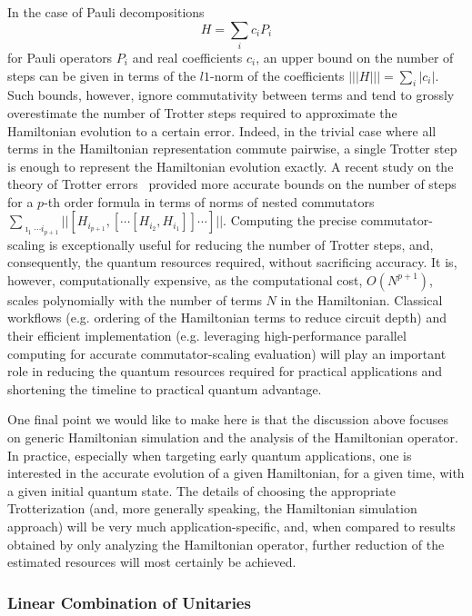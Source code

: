 In the case of Pauli decompositions
\begin{equation}
    H=\sum_i c_iP_i
\end{equation}
for Pauli operators $P_i$ and real coefficients $c_i$, an upper bound on the number of steps can be given in terms of the $l1$-norm of the coefficients $|||H|||=\sum_i|c_i|$.
Such bounds, however, ignore commutativity between terms and tend to grossly overestimate the number of Trotter steps required to approximate the Hamiltonian evolution to a certain error. Indeed, in the trivial case where all terms in the Hamiltonian representation commute pairwise, a single Trotter step is enough to represent the Hamiltonian evolution exactly. A recent study on the theory of Trotter errors~\cite{childs2019theory} provided more accurate bounds on the number of steps for a $p$-th order formula in terms of norms of nested commutators $\sum_{\imath_1 \cdots i_{p+1}}||[H_{i_{p+1}}, [\cdots[H_{i_2}, H_{i_1}]]\cdots]||$.  Computing the precise commutator-scaling is exceptionally useful for reducing the number of Trotter steps, and, consequently, the quantum resources required, without sacrificing accuracy. It is, however, computationally expensive, as the computational cost, $O(N^{p+1})$, scales polynomially with the number of terms $N$ in the Hamiltonian.
Classical workflows (e.g. ordering of the Hamiltonian terms to reduce circuit depth) and their efficient implementation (e.g. leveraging high-performance parallel computing for accurate commutator-scaling evaluation) will play an important role in reducing the quantum resources required for practical applications and shortening the timeline to practical quantum advantage. 

One final point we would like to make here is that the discussion above focuses on generic Hamiltonian simulation and the analysis of the Hamiltonian operator. In practice, especially when targeting early quantum applications, one is interested in the accurate evolution of a given Hamiltonian, for a given time, with a given initial quantum state. The details of choosing the appropriate Trotterization (and, more generally speaking, the Hamiltonian simulation approach) will be very much application-specific, and, when compared to results obtained by only analyzing the Hamiltonian operator, further reduction of the estimated resources will most certainly be achieved.


\subsubsection{Linear Combination of Unitaries}


